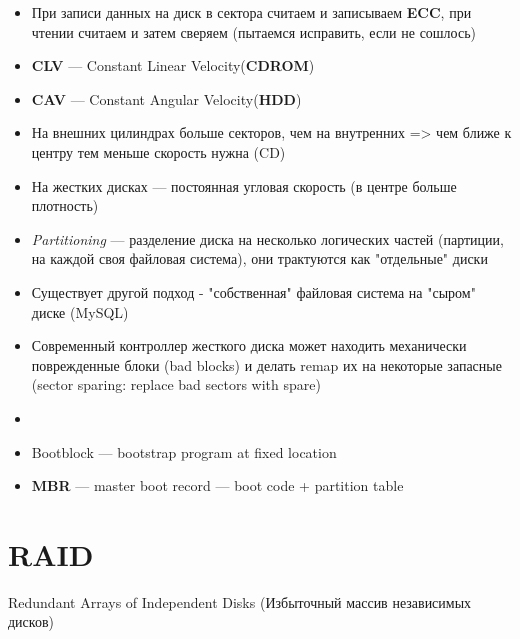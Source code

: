 \documentclass[../../lectures.tex]{subfiles}
\begin{document}
\begin{itemize}
    \item При записи данных на диск в сектора считаем и записываем \textbf{ECC},
          при чтении считаем и затем сверяем (пытаемся исправить, если не сошлось)

    \item \textbf{CLV} --- Constant Linear Velocity(\textbf{CDROM})
    \item \textbf{CAV} --- Constant Angular Velocity(\textbf{HDD})
    \item На внешних цилиндрах больше секторов, чем на внутренних 
          => чем ближе к центру тем меньше скорость нужна (CD)
    \item На жестких дисках --- постоянная угловая скорость 
          (в центре больше плотность)
    \item \emph{Partitioning} --- разделение диска на несколько 
          логических частей (партиции, на каждой своя файловая система),
          они трактуются как "отдельные" диски
    \item Существует другой подход - "собственная" файловая система 
          на "сыром" диске (MySQL)
    \item Современный контроллер жесткого диска может находить механически поврежденные блоки (bad blocks) и делать remap их на некоторые запасные (sector sparing: replace bad sectors with spare)
    \item {}
    \item Bootblock --- bootstrap program at fixed location
    \item \textbf{MBR} --- master boot record --- boot code + partition table
\end{itemize}

\section{RAID}
Redundant Arrays of Independent Disks (Избыточный массив независимых дисков)
\end{document}
